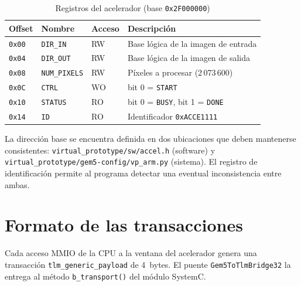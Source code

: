 \documentclass[11pt,letterpaper]{article}
\begin{document}
\begin{table}[H]
\centering
\caption{Registros del acelerador (base \texttt{0x2F000000})}
\label{tab:registros-vp}
\begin{tabular}{@{}llll@{}}
\toprule
\textbf{Offset} & \textbf{Nombre} & \textbf{Acceso} & \textbf{Descripción} \\
\midrule
\texttt{0x00} & \texttt{DIR\_IN}     & RW & Base lógica de la imagen de entrada \\
\texttt{0x04} & \texttt{DIR\_OUT}    & RW & Base lógica de la imagen de salida \\
\texttt{0x08} & \texttt{NUM\_PIXELS} & RW & Píxeles a procesar (2\,073\,600) \\
\texttt{0x0C} & \texttt{CTRL}        & WO & bit 0 = \texttt{START} \\
\texttt{0x10} & \texttt{STATUS}      & RO & bit 0 = \texttt{BUSY},
                                            bit 1 = \texttt{DONE} \\
\texttt{0x14} & \texttt{ID}          & RO & Identificador \texttt{0xACCE1111} \\
\bottomrule
\end{tabular}
\end{table}

La dirección base se encuentra definida en dos ubicaciones que deben mantenerse
consistentes: \texttt{virtual\_prototype/sw/accel.h} (software) y
\texttt{virtual\_prototype/gem5-config/vp\_arm.py} (sistema). El registro de
identificación permite al programa detectar una eventual inconsistencia entre
ambas.

\section{Formato de las transacciones}

Cada acceso MMIO de la CPU a la ventana del acelerador genera una transacción
\texttt{tlm\_generic\_payload} de 4~bytes. El puente
\texttt{Gem5ToTlmBridge32} la entrega al método \texttt{b\_transport()}
del módulo SystemC.
\end{document}
